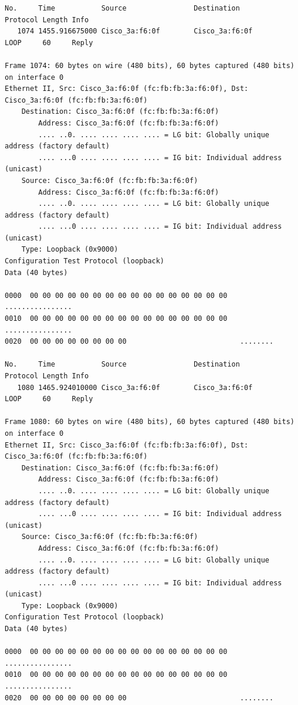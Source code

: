 \documentclass[a4paper,11pt]{article}
\begin{document}
\begin{lstlisting}
No.     Time           Source                Destination           Protocol Length Info
   1074 1455.916675000 Cisco_3a:f6:0f        Cisco_3a:f6:0f        LOOP     60     Reply

Frame 1074: 60 bytes on wire (480 bits), 60 bytes captured (480 bits) on interface 0
Ethernet II, Src: Cisco_3a:f6:0f (fc:fb:fb:3a:f6:0f), Dst: Cisco_3a:f6:0f (fc:fb:fb:3a:f6:0f)
    Destination: Cisco_3a:f6:0f (fc:fb:fb:3a:f6:0f)
        Address: Cisco_3a:f6:0f (fc:fb:fb:3a:f6:0f)
        .... ..0. .... .... .... .... = LG bit: Globally unique address (factory default)
        .... ...0 .... .... .... .... = IG bit: Individual address (unicast)
    Source: Cisco_3a:f6:0f (fc:fb:fb:3a:f6:0f)
        Address: Cisco_3a:f6:0f (fc:fb:fb:3a:f6:0f)
        .... ..0. .... .... .... .... = LG bit: Globally unique address (factory default)
        .... ...0 .... .... .... .... = IG bit: Individual address (unicast)
    Type: Loopback (0x9000)
Configuration Test Protocol (loopback)
Data (40 bytes)

0000  00 00 00 00 00 00 00 00 00 00 00 00 00 00 00 00   ................
0010  00 00 00 00 00 00 00 00 00 00 00 00 00 00 00 00   ................
0020  00 00 00 00 00 00 00 00                           ........

No.     Time           Source                Destination           Protocol Length Info
   1080 1465.924010000 Cisco_3a:f6:0f        Cisco_3a:f6:0f        LOOP     60     Reply

Frame 1080: 60 bytes on wire (480 bits), 60 bytes captured (480 bits) on interface 0
Ethernet II, Src: Cisco_3a:f6:0f (fc:fb:fb:3a:f6:0f), Dst: Cisco_3a:f6:0f (fc:fb:fb:3a:f6:0f)
    Destination: Cisco_3a:f6:0f (fc:fb:fb:3a:f6:0f)
        Address: Cisco_3a:f6:0f (fc:fb:fb:3a:f6:0f)
        .... ..0. .... .... .... .... = LG bit: Globally unique address (factory default)
        .... ...0 .... .... .... .... = IG bit: Individual address (unicast)
    Source: Cisco_3a:f6:0f (fc:fb:fb:3a:f6:0f)
        Address: Cisco_3a:f6:0f (fc:fb:fb:3a:f6:0f)
        .... ..0. .... .... .... .... = LG bit: Globally unique address (factory default)
        .... ...0 .... .... .... .... = IG bit: Individual address (unicast)
    Type: Loopback (0x9000)
Configuration Test Protocol (loopback)
Data (40 bytes)

0000  00 00 00 00 00 00 00 00 00 00 00 00 00 00 00 00   ................
0010  00 00 00 00 00 00 00 00 00 00 00 00 00 00 00 00   ................
0020  00 00 00 00 00 00 00 00                           ........


\end{lstlisting}
\end{document}
